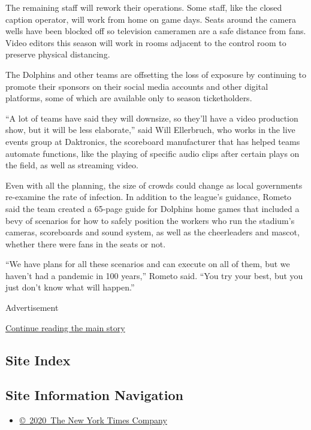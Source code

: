 The remaining staff will rework their operations. Some staff, like the
closed caption operator, will work from home on game days. Seats around
the camera wells have been blocked off so television cameramen are a
safe distance from fans. Video editors this season will work in rooms
adjacent to the control room to preserve physical distancing.

The Dolphins and other teams are offsetting the loss of exposure by
continuing to promote their sponsors on their social media accounts and
other digital platforms, some of which are available only to season
ticketholders.

``A lot of teams have said they will downsize, so they'll have a video
production show, but it will be less elaborate,'' said Will Ellerbruch,
who works in the live events group at Daktronics, the scoreboard
manufacturer that has helped teams automate functions, like the playing
of specific audio clips after certain plays on the field, as well as
streaming video.

Even with all the planning, the size of crowds could change as local
governments re-examine the rate of infection. In addition to the
league's guidance, Rometo said the team created a 65-page guide for
Dolphins home games that included a bevy of scenarios for how to safely
position the workers who run the stadium's cameras, scoreboards and
sound system, as well as the cheerleaders and mascot, whether there were
fans in the seats or not.

``We have plans for all these scenarios and can execute on all of them,
but we haven't had a pandemic in 100 years,'' Rometo said. ``You try
your best, but you just don't know what will happen.''

Advertisement

\protect\hyperlink{after-bottom}{Continue reading the main story}

\hypertarget{site-index}{%
\subsection{Site Index}\label{site-index}}

\hypertarget{site-information-navigation}{%
\subsection{Site Information
Navigation}\label{site-information-navigation}}

\begin{itemize}
\tightlist
\item
  \href{https://help.nytimes3xbfgragh.onion/hc/en-us/articles/115014792127-Copyright-notice}{©~2020~The
  New York Times Company}
\end{itemize}

